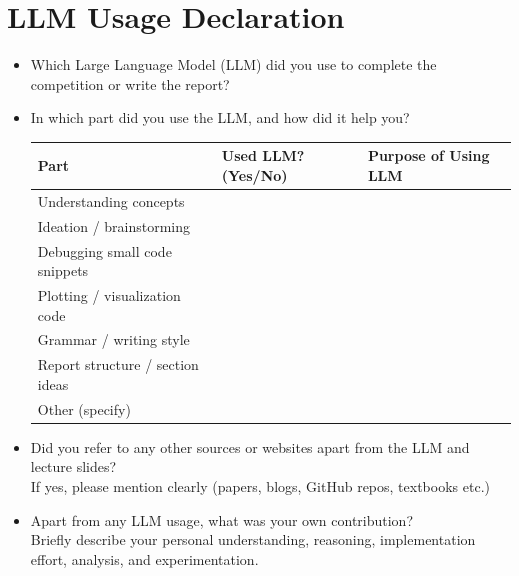 \documentclass[11pt, oneside]{article}   	%
\begin{document}
\section*{LLM Usage Declaration}
\begin{itemize}
\item Which Large Language Model (LLM) did you use to complete the competition or write the report? \\

\item In which part did you use the LLM, and how did it help you?

\begin{tabular}{l|l|l}
\toprule
Part & Used LLM? (Yes/No) & Purpose of Using LLM \\
\midrule
Understanding concepts &  &   \\
Ideation / brainstorming &  &   \\
Debugging small code snippets &  &   \\
Plotting / visualization code &  &   \\
Grammar / writing style &  &   \\
Report structure / section ideas &  &  \\
Other (specify) &  &   \\
\bottomrule
\end{tabular}

\item Did you refer to any other sources or websites apart from the LLM and lecture slides? \\
If yes, please mention clearly (papers, blogs, GitHub repos, textbooks etc.)

\item Apart from any LLM usage, what was your own contribution? \\
Briefly describe your personal understanding, reasoning, implementation effort, analysis, and experimentation.
\end{itemize}

\vspace{2cm}




\end{document}
